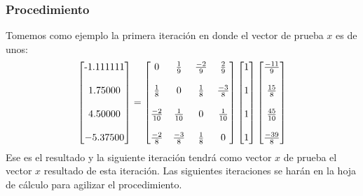 \documentclass{article}
\begin{document}
\subsubsection{Procedimiento}
Tomemos como ejemplo la primera iteración en donde el vector de prueba $x$ es de unos:
\begin{equation*}
   \begin{bmatrix}
       $-1.111111$ \\
       \\
       1.75000 \\
       \\
       4.50000 \\
       \\
       -5.37500
   \end{bmatrix}
   =
   \begin{bmatrix}
       0 & \frac{1}{9} & \frac{-2}{9} & \frac{2}{9} \\
       \\
       \frac{1}{8} & 0 & \frac{1}{8} & \frac{-3}{8} \\
       \\
       \frac{-2}{10} & \frac{1}{10} & 0 & \frac{1}{10} \\
       \\
       \frac{-2}{8} & \frac{-3}{8} & \frac{1}{8} & 0 \\
   \end{bmatrix}
   \begin{bmatrix}
       1 \\
       \\
       1 \\
       \\
       1 \\
       \\
       1
   \end{bmatrix}
   \begin{bmatrix}
       \frac{-11}{9} \\
       \\
       \frac{15}{8} \\
       \\
       \frac{45}{10} \\
       \\
       \frac{-39}{8}
   \end{bmatrix}
\end{equation*}
Ese es el resultado y la siguiente iteración tendrá como vector $x$ de prueba el vector $x$ resultado
de esta iteración. Las siguientes iteraciones se harán en la hoja de cálculo para agilizar el procedimiento.
\end{document}
